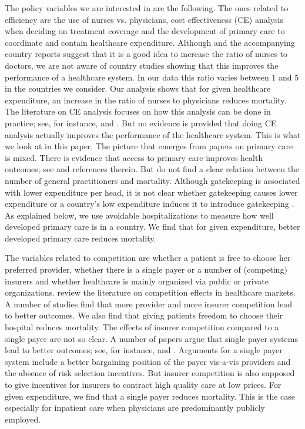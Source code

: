 \documentclass[12pt,english,a4paper]{article}
\begin{document}
The policy variables we are interested in are the following. The ones related to efficiency are the use of nurses vs. physicians, cost effectiveness (CE) analysis when deciding on treatment coverage and the development of primary care to coordinate and contain healthcare expenditure. Although \cite{countryprofileReport} and the accompanying country reports suggest that it is a good idea to increase the ratio of nurses to doctors, we are not aware of country studies showing that this improves the performance of a healthcare system. In our data this ratio varies between 1 and 5 in the countries we consider. Our analysis shows that for given healthcare expenditure, an increase in the ratio of nurses to physicians reduces mortality. The literature on CE analysis focuses on how this analysis can be done in practice; see, for instance, \cite{Drummond2005} and \cite{Gold96e}. But no evidence is provided that doing CE analysis actually improves the performance of the healthcare system. This is what we look at in this paper. The picture that emerges from papers on primary care is mixed. There is evidence that access to primary care improves health outcomes; see \cite{starfield2005} and references therein. But \cite{AAKVIK20061139} do not find a clear relation between the number of general practitioners and mortality. Although gatekeeping is associated with lower expenditure per head, it is not clear whether gatekeeping causes lower expenditure or a country's low expenditure induces it to introduce gatekeeping \citep{Forrest692}. As explained below, we use avoidable hospitalizations to measure how well developed primary care is in a country. We find that for given expenditure, better developed primary care reduces mortality.

The variables related to competition are whether a patient is free to choose her preferred provider, whether there is a single payer or a number of (competing) insurers and whether healthcare is mainly organized via public or private organizations. \cite{NBERw19800} review the literature on competition effects in healthcare markets. A number of studies find that more provider and more insurer competition lead to better outcomes. We also find that giving patients freedom to choose their hospital reduces mortality. The effects of insurer competition compared to a single payer are not so clear. A number of papers argue that single payer systems lead to better outcomes; see, for instance, \cite{BICHAY2020113454} and \cite{OberlanderSinglePayer}. Arguments for a single payer system include a better bargaining position of the payer vis-a-vis providers and the absence of risk selection incentives. But insurer competition is also supposed to give incentives for insurers to contract high quality care at low prices. For given expenditure, we find that a single payer reduces mortality. This is the case especially for inpatient care when physicians are predominantly publicly employed.
\end{document}
